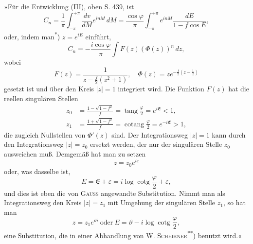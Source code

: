 \indent »Für die Entwicklung (III), oben S. 439, ist
\[
C_n=\frac1\pi\int_{-\pi}^{+\pi}\frac{dv}{dM}e^{inM}\,dM
=\frac{\cos\varphi}\pi\int_{-\pi}^{+\pi}e^{inM}\frac{dE}{1-f\cos E},
\]
\noindent oder, indem man\textsuperscript{*}) \(z=e^{iE}\) einführt,
\[
C_n=-\frac{i\cos\varphi}\pi\int F(z)(\Phi(z))^n\,dz,
\]
\noindent wobei
\[
F(z)=\frac1{z-\frac f2(z^2+1)},\quad
\Phi(z)=ze^{-\frac f2\left(z-\frac1z\right)}
\]
\noindent gesetzt ist und über den Kreis \(|z|=1\) integriert wird. Die Funktion \(F(z)\) hat die reellen singulären Stellen
\[
\begin{aligned}
z_0&=\frac{1-\sqrt{1-f^2}}f=\operatorname{tang}\frac\varphi2=e^{i\mathfrak E}<1,\\[4pt]
z_1&=\frac{1+\sqrt{1-f^2}}f=\operatorname{cotang}\frac\varphi2=e^{-i\mathfrak E}>1,
\end{aligned}
\]
\noindent die zugleich Nullstellen von \(\Phi'(z)\) sind. Der Integrationsweg \(|z|=1\) kann durch den Integrationsweg \(|z|=z_0\) ersetzt werden, der nur der singulären Stelle \(z_0\) ausweichen muß. Demgemäß hat man zu setzen
\[
z=z_0e^{i\varepsilon}
\]
\noindent oder, was dasselbe ist,
\[
E=\mathfrak E+\varepsilon=i\log\operatorname{cotg}\frac\varphi2+\varepsilon,
\]
\noindent und dies ist eben die von \textsc{Gauss} angewandte Substitution. Nimmt man als Integrationsweg den Kreis \(|z|=z_1\) mit Umgehung der singulären Stelle \(z_1\), so hat man
\[
z=z_1e^{\vartheta i}\ \text{oder}\ E=\vartheta-i\log\operatorname{cotg}\frac\varphi2,
\]
\noindent eine Substitution, die in einer Abhandlung von W. \textsc{Scheibner}\textsuperscript{**}) benutzt wird.«

